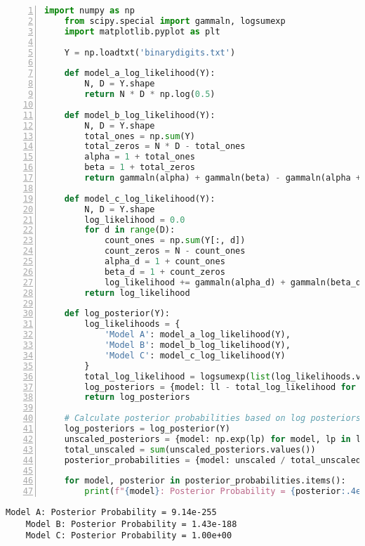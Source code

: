 \documentclass{article}
\begin{document}
    \vspace{-0.5em}
    \begin{lstlisting}[language=Python, numbers=left, frame=single, breaklines=true]
    import numpy as np
    from scipy.special import gammaln, logsumexp
    import matplotlib.pyplot as plt
    
    Y = np.loadtxt('binarydigits.txt')
    
    def model_a_log_likelihood(Y):
        N, D = Y.shape
        return N * D * np.log(0.5)
    
    def model_b_log_likelihood(Y):
        N, D = Y.shape
        total_ones = np.sum(Y)
        total_zeros = N * D - total_ones
        alpha = 1 + total_ones
        beta = 1 + total_zeros
        return gammaln(alpha) + gammaln(beta) - gammaln(alpha + beta)
    
    def model_c_log_likelihood(Y):
        N, D = Y.shape
        log_likelihood = 0.0
        for d in range(D):
            count_ones = np.sum(Y[:, d])
            count_zeros = N - count_ones
            alpha_d = 1 + count_ones
            beta_d = 1 + count_zeros
            log_likelihood += gammaln(alpha_d) + gammaln(beta_d) - gammaln(alpha_d + beta_d)
        return log_likelihood
    
    def log_posterior(Y):
        log_likelihoods = {
            'Model A': model_a_log_likelihood(Y),
            'Model B': model_b_log_likelihood(Y),
            'Model C': model_c_log_likelihood(Y)
        }
        total_log_likelihood = logsumexp(list(log_likelihoods.values()))
        log_posteriors = {model: ll - total_log_likelihood for model, ll in log_likelihoods.items()}
        return log_posteriors
    
    # Calculate posterior probabilities based on log posteriors
    log_posteriors = log_posterior(Y)
    unscaled_posteriors = {model: np.exp(lp) for model, lp in log_posteriors.items()}
    total_unscaled = sum(unscaled_posteriors.values())
    posterior_probabilities = {model: unscaled / total_unscaled for model, unscaled in unscaled_posteriors.items()}
    
    for model, posterior in posterior_probabilities.items():
        print(f"{model}: Posterior Probability = {posterior:.4e}")
    \end{lstlisting}
    \begin{lstlisting}[frame=single]
    Model A: Posterior Probability = 9.14e-255
    Model B: Posterior Probability = 1.43e-188
    Model C: Posterior Probability = 1.00e+00
    \end{lstlisting}
\end{document}
